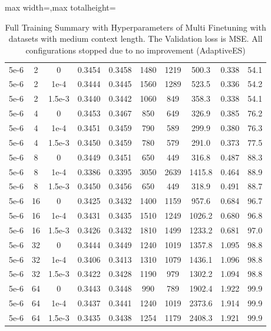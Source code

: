 \begin{table}[p]
\begin{adjustbox}{max width=\textwidth,max totalheight=\textheight}
\begin{tabular}{cccccccccc}
5e-6&2&0&0.3454&0.3458&1480&1219&500.3&0.338&54.1\\
5e-6&2&1e-4&0.3444&0.3445&1560&1289&523.5&0.336&54.2\\
5e-6&2&1.5e-3&0.3440&0.3442&1060&849&358.3&0.338&54.1\\
5e-6&4&0&0.3453&0.3467&850&649&326.9&0.385&76.2\\
5e-6&4&1e-4&0.3451&0.3459&790&589&299.9&0.380&76.3\\
5e-6&4&1.5e-3&0.3450&0.3459&780&579&291.0&0.373&77.5\\
5e-6&8&0&0.3449&0.3451&650&449&316.8&0.487&88.3\\
5e-6&8&1e-4&0.3386&0.3395&3050&2639&1415.8&0.464&88.9\\
5e-6&8&1.5e-3&0.3450&0.3456&650&449&318.9&0.491&88.7\\
5e-6&16&0&0.3425&0.3432&1400&1159&957.6&0.684&96.7\\
5e-6&16&1e-4&0.3431&0.3435&1510&1249&1026.2&0.680&96.8\\
5e-6&16&1.5e-3&0.3426&0.3432&1810&1499&1233.2&0.681&97.0\\
5e-6&32&0&0.3444&0.3449&1240&1019&1357.8&1.095&98.8\\
5e-6&32&1e-4&0.3406&0.3413&1310&1079&1436.1&1.096&98.8\\
5e-6&32&1.5e-3&0.3422&0.3428&1190&979&1302.2&1.094&98.8\\
5e-6&64&0&0.3443&0.3448&990&789&1902.4&1.922&99.9\\
5e-6&64&1e-4&0.3437&0.3441&1240&1019&2373.6&1.914&99.9\\
5e-6&64&1.5e-3&0.3435&0.3438&1254&1179&2408.3&1.921&99.9\\
\hline
\end{tabular}
\end{adjustbox}
\caption{Full Training Summary with Hyperparameters of Multi Finetuning with datasets with medium context length. The Validation loss is MSE. All configurations stopped due to no improvement (AdaptiveES)}
\end{table}


